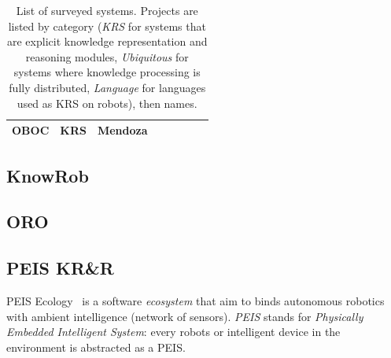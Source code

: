 \documentclass[a4paper, twocolumn]{article}
\begin{document}
\begin{landscape}
\begin{table}
\begin{center}
\begin{tabular}{p{2.2cm}p{1.6cm}p{4cm}lp{2.4cm}p{3.4cm}p{2.8cm}p{1.5cm}}
OBOC & KRS & Mendoza & & & & & \cite{Mendoza2005} \\

\bottomrule

\end{tabular}
\end{center}

\caption{List of surveyed systems. Projects are listed by category (\emph{KRS}
for systems that are explicit knowledge representation and reasoning modules,
\emph{Ubiquitous} for systems where knowledge processing is fully distributed,
\emph{Language} for languages used as KRS on robots), then names.}

\label{table|surveyed-systems}
\end{table}
\end{landscape}


\subsection{KnowRob}
\label{sect|knowrob}

\subsection{ORO}
\label{sect|oro}

\subsection{PEIS KR\&R}
\label{sect|peis-ecology}


{\sc PEIS Ecology}~\cite{Saffiotti2005} is a software \emph{ecosystem} that aim to binds autonomous
robotics with ambient intelligence (network of sensors). \emph{PEIS} stands for
\emph{Physically Embedded Intelligent System}: every robots or intelligent
device in the environment is abstracted as a PEIS.
\end{document}
